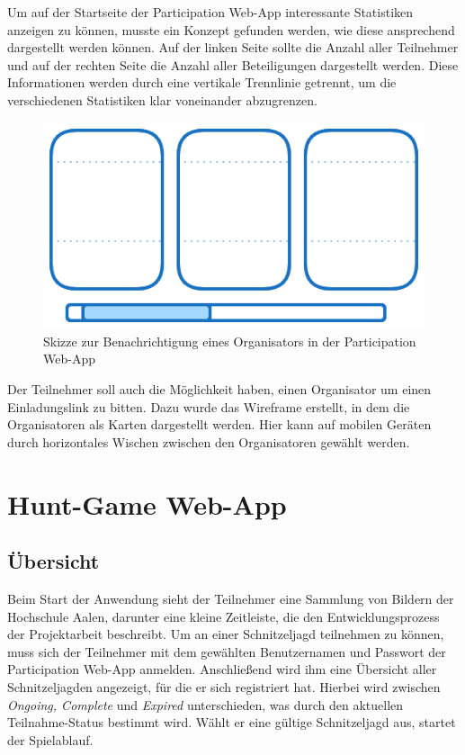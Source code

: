 Um auf der Startseite der Participation Web-App interessante Statistiken anzeigen zu können, musste ein Konzept gefunden werden, wie diese ansprechend dargestellt werden können. Auf der linken Seite sollte die Anzahl aller Teilnehmer und auf der rechten Seite die Anzahl aller Beteiligungen dargestellt werden. Diese Informationen werden durch eine vertikale Trennlinie getrennt, um die verschiedenen Statistiken klar voneinander abzugrenzen.

\begin{figure}[H]
  \centering
  \includegraphics[width=1\textwidth]{images/PrAr_Scavhunt_Wireframing_Participant_2.png}
  \caption{Skizze zur Benachrichtigung eines Organisators in der Participation Web-App}
  \label{fig:wireframing-frontend-participant-2}
\end{figure}

Der Teilnehmer soll auch die Möglichkeit haben, einen Organisator um einen Einladungslink zu bitten. Dazu wurde das Wireframe erstellt, in dem die Organisatoren als Karten dargestellt werden. Hier kann auf mobilen Geräten durch horizontales Wischen zwischen den Organisatoren gewählt werden. 
\section{Hunt-Game Web-App} \label{subsec:swentwurf:hunt-game}

\subsection{Übersicht}
Beim Start der Anwendung sieht der Teilnehmer eine Sammlung von Bildern der Hochschule Aalen, darunter eine kleine Zeitleiste, die den Entwicklungsprozess der Projektarbeit beschreibt. Um an einer Schnitzeljagd teilnehmen zu können, muss sich der Teilnehmer mit dem gewählten Benutzernamen und Passwort der Participation Web-App anmelden. Anschließend wird ihm eine Übersicht aller Schnitzeljagden angezeigt, für die er sich registriert hat. Hierbei wird zwischen \textit{Ongoing, Complete} und \textit{Expired} unterschieden, was durch den aktuellen Teilnahme-Status bestimmt wird. Wählt er eine gültige Schnitzeljagd aus, startet der Spielablauf. 

